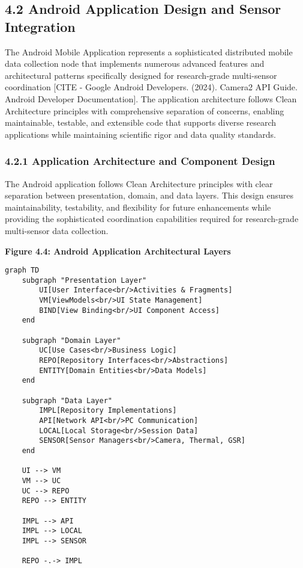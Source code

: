 \documentclass[12pt,a4paper]{article}
\begin{document}
\subsection{4.2 Android Application Design and Sensor Integration}

The Android Mobile Application represents a sophisticated distributed mobile data collection node that implements
numerous advanced features and architectural patterns specifically designed for research-grade multi-sensor
coordination [CITE - Google Android Developers. (2024). Camera2 API Guide. Android Developer Documentation]. The
application architecture follows Clean Architecture principles with comprehensive separation of concerns, enabling
maintainable, testable, and extensible code that supports diverse research applications while maintaining scientific
rigor and data quality standards.

\subsubsection{4.2.1 Application Architecture and Component Design}

The Android application follows Clean Architecture principles with clear separation between presentation, domain, and
data layers. This design ensures maintainability, testability, and flexibility for future enhancements while providing
the sophisticated coordination capabilities required for research-grade multi-sensor data collection.

\textbf{Figure 4.4: Android Application Architectural Layers}

\begin{verbatim}
graph TD
    subgraph "Presentation Layer"
        UI[User Interface<br/>Activities & Fragments]
        VM[ViewModels<br/>UI State Management]
        BIND[View Binding<br/>UI Component Access]
    end
    
    subgraph "Domain Layer"
        UC[Use Cases<br/>Business Logic]
        REPO[Repository Interfaces<br/>Abstractions]
        ENTITY[Domain Entities<br/>Data Models]
    end
    
    subgraph "Data Layer"
        IMPL[Repository Implementations]
        API[Network API<br/>PC Communication]
        LOCAL[Local Storage<br/>Session Data]
        SENSOR[Sensor Managers<br/>Camera, Thermal, GSR]
    end
    
    UI --> VM
    VM --> UC
    UC --> REPO
    REPO --> ENTITY
    
    IMPL --> API
    IMPL --> LOCAL
    IMPL --> SENSOR
    
    REPO -.-> IMPL
\end{verbatim}
\end{document}
